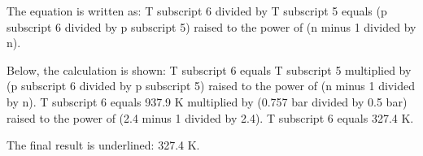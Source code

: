 The equation is written as:  
T subscript 6 divided by T subscript 5 equals (p subscript 6 divided by p subscript 5) raised to the power of (n minus 1 divided by n).  

Below, the calculation is shown:  
T subscript 6 equals T subscript 5 multiplied by (p subscript 6 divided by p subscript 5) raised to the power of (n minus 1 divided by n).  
T subscript 6 equals 937.9 K multiplied by (0.757 bar divided by 0.5 bar) raised to the power of (2.4 minus 1 divided by 2.4).  
T subscript 6 equals 327.4 K.  

The final result is underlined: 327.4 K.